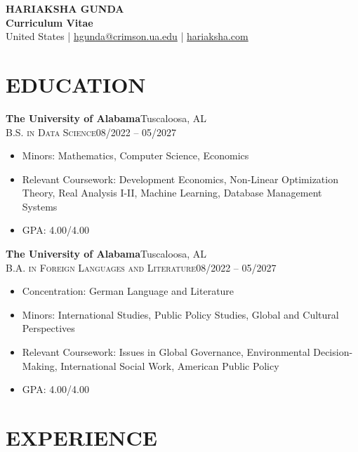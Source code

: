 \documentclass[a4paper,9pt]{extarticle}
\newcommand{\eduitem}[4]{%
  \noindent\textbf{#1}\hfill #2\\
  \textsc{#3}\hfill #4
}
\begin{document}
\pagestyle{fancy}
\fancyhf{} %
\renewcommand{\headrulewidth}{0pt} %
\renewcommand{\footrulewidth}{0pt} %
\fancyfoot[L]{\small\DTMtoday}
\fancyfoot[R]{\small\thepage}

\begin{center}
    \textbf{\Large HARIAKSHA GUNDA }\\[3pt] %
    \textbf{Curriculum Vitae}\\[1pt] %
    United States | \href{mailto:hgunda@crimson.ua.edu}{hgunda@crimson.ua.edu} | \href{https://www.hariaksha.com}{hariaksha.com} %
\end{center}

\section*{EDUCATION}

\eduitem{The University of Alabama}{Tuscaloosa, AL}
  {B.S. in Data Science}{08/2022 -- 05/2027}
\begin{itemize}[leftmargin=1.5em, topsep=3pt, partopsep=0pt, itemsep=0pt]
  \item Minors: Mathematics, Computer Science, Economics
  \item Relevant Coursework: Development Economics, Non-Linear Optimization Theory, Real Analysis I-II, Machine Learning, Database Management Systems
  \item GPA: 4.00/4.00
\end{itemize}

\vspace{0.5\baselineskip}

\eduitem{The University of Alabama}{Tuscaloosa, AL}
  {B.A. in Foreign Languages and Literature}{08/2022 -- 05/2027}
\begin{itemize}[leftmargin=1.5em, topsep=3pt, partopsep=0pt, itemsep=0pt]
  \item Concentration: German Language and Literature
  \item Minors: International Studies, Public Policy Studies, Global and Cultural Perspectives
  \item Relevant Coursework: Issues in Global Governance, Environmental Decision-Making, International Social Work, American Public Policy
  \item GPA: 4.00/4.00
\end{itemize}
\section*{EXPERIENCE}
\end{document}
